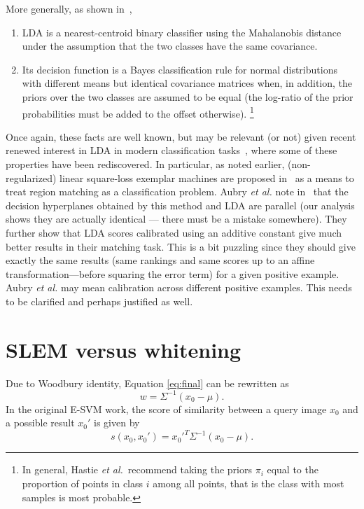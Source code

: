 \documentclass[12pt,letterpaper]{article}
\begin{document}
More generally, as shown in~\cite{Hastie2009},
\begin{enumerate}
\item LDA is a nearest-centroid binary classifier using the
Mahalanobis distance under the assumption that the two classes
have the same covariance.
\item Its decision function is a Bayes classification rule for normal
distributions with different means but identical covariance matrices
when, in addition, the priors over the two classes are assumed to be
equal (the log-ratio of the prior probabilities must be added to the
offset otherwise). \footnote{In general, Hastie
{\em et al.}~recommend taking the priors $\pi_i$ equal to the proportion of points
in class $i$ among all points, that is the class with most samples is
most probable.}
\end{enumerate}
 
Once again, these facts are well known, but may be relevant (or not)
given recent renewed interest in LDA in modern classification
tasks~\cite{GMPD12,HMR12}, where some of these properties have been
rediscovered. In particular, as noted earlier, (non-regularized)
linear square-loss exemplar machines are proposed in~\cite{ARS14} as a
means to treat region matching as a classification problem. Aubry {\em
et al.} note in~\cite{ARS14} that the decision hyperplanes obtained by
this method and LDA are parallel (our analysis shows they are actually
identical --- there must be a mistake somewhere). They further show
that LDA scores calibrated using an additive constant give much better
results in their matching task. This is a bit puzzling since they
should give exactly the same results (same rankings and same scores up
to an affine transformation---before squaring the error term) for a
given positive example. Aubry {\em et al.} may mean calibration across
different positive examples. This needs to be clarified and perhaps
justified as well.
 
\section{SLEM versus whitening}
Due to Woodbury identity, Equation \ref{eq:final} can be rewritten as 
\begin{equation}
w = \Sigma^{-1}(x_0-\mu).
\end{equation}
In the original E-SVM work, the score of similarity between a query image $x_0$ and a possible result $x_0'$ is given by
\begin{equation}
s(x_0,x_0') = x_0'^T\Sigma^{-1}(x_0-\mu). \label{white:score}
\end{equation}
 
\end{document}
